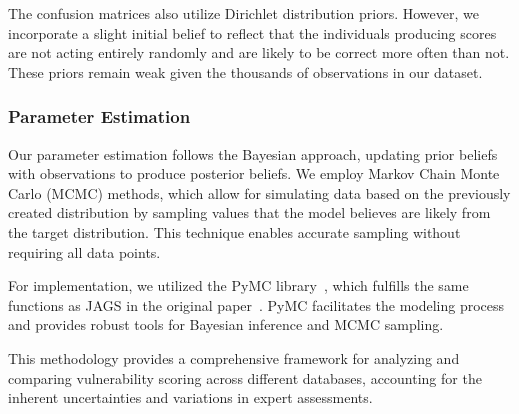 \documentclass[12pt]{article}
\begin{document}
The confusion matrices also utilize Dirichlet distribution priors. However, we incorporate a slight
initial belief to reflect that the individuals producing scores are not acting entirely randomly and
are likely to be correct more often than not. These priors remain weak given the thousands of
observations in our dataset.

\subsubsection{Parameter Estimation}

Our parameter estimation follows the Bayesian approach, updating prior beliefs with observations to
produce posterior beliefs. We employ Markov Chain Monte Carlo (MCMC) methods, which allow for
simulating data based on the previously created distribution by sampling values that the model
believes are likely from the target distribution. This technique enables accurate sampling without
requiring all data points.

For implementation, we utilized the PyMC library~\cite{pymc}, which fulfills the same functions as
JAGS in the original paper~\cite{bayes}. PyMC facilitates the modeling process and provides robust
tools for Bayesian inference and MCMC sampling.

This methodology provides a comprehensive framework for analyzing and comparing vulnerability
scoring across different databases, accounting for the inherent uncertainties and variations in
expert assessments.


\end{document}
